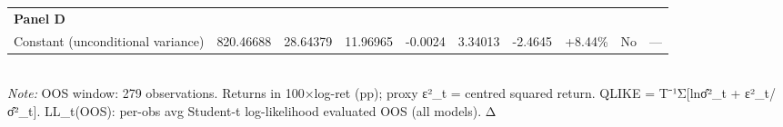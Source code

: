 \begin{table}[ht]
\begin{tabular}{lrrrrrrrrr}
\multicolumn{10}{l}{\textbf{Panel D}} \\
Constant (unconditional variance) & 820.46688 & 28.64379 & 11.96965 & -0.0024 & 3.34013 & -2.4645 & +8.44\% & No & — \\
\bottomrule
\end{tabular}
\\[3pt]\footnotesize\textit{Note:} OOS window: 279 observations. Returns in 100×log-ret (pp); proxy ε²_t = centred squared return. QLIKE = T⁻¹Σ[lnσ̂²_t + ε²_t/σ̂²_t]. LL_t(OOS): per-obs avg Student-t log-likelihood evaluated OOS (all models). Δ%
\end{table}